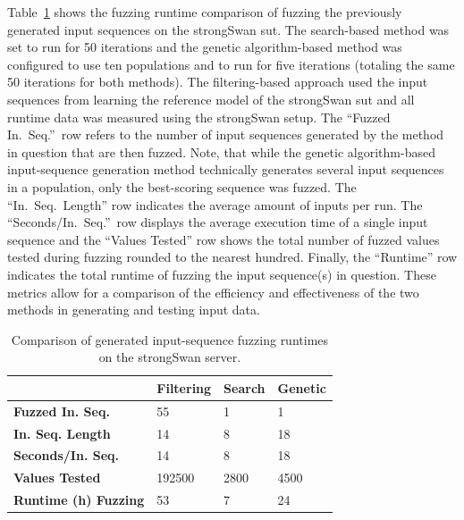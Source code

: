 Table~\ref{tab:compfuzz} shows the fuzzing runtime comparison of fuzzing the previously generated input sequences on the strongSwan \ac{sut}. The search-based method was set to run for 50 iterations and the genetic algorithm-based method was configured to use ten populations and to run for five iterations (totaling the same 50 iterations for both methods). The filtering-based approach used the input sequences from learning the reference model of the strongSwan \ac{sut} and all runtime data was measured using the strongSwan setup. The ``Fuzzed In.~Seq.''~row refers to the number of input sequences generated by the method in question that are then fuzzed. Note, that while the genetic algorithm-based input-sequence generation method technically generates several input sequences in a population, only the best-scoring sequence was fuzzed. The ``In.~Seq.~Length'' row indicates the average amount of inputs per run. The ``Seconds/In.~Seq.''~row displays the average execution time of a single input sequence and the ``Values Tested'' row shows the total number of fuzzed values tested during fuzzing rounded to the nearest hundred. Finally, the ``Runtime'' row indicates the total runtime of fuzzing the input sequence(s) in question. These metrics allow for a comparison of the efficiency and effectiveness of the two methods in generating and testing input data.


\begin{table}[H]
	\centering
	\begin{tabular}{|l|l|l|l|}
		\hline
		\rowcolor[HTML]{EFEFEF} 
		& \textbf{Filtering}					& \textbf{Search} 			& \textbf{Genetic}  \\ \hline
		\textbf{Fuzzed In. Seq.}            	& 55                 					& 1                			& 1					\\ \hline
		\textbf{In. Seq. Length}				& 14                					& 8               			& 18		  		\\ \hline
		\textbf{Seconds/In. Seq.}     			& 14                					& 8                			& 18				\\ \hline
		\textbf{Values Tested}     				& 192500              					& 2800		    			& 4500				\\ \hline
		\textbf{Runtime (h) Fuzzing}       		& 53          	 						& 7          				& 24				\\ \hline
	\end{tabular}
	\caption{Comparison of generated input-sequence fuzzing runtimes on the strongSwan server.}
	\label{tab:compfuzz}
\end{table}

